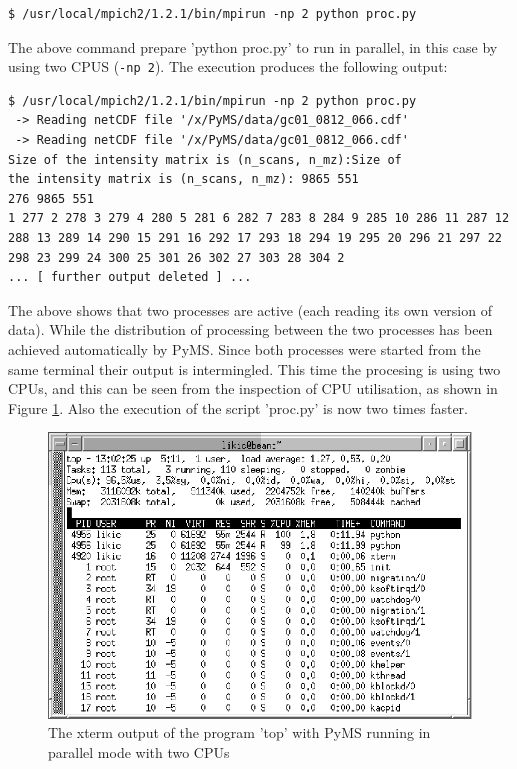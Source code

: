 \begin{verbatim}
$ /usr/local/mpich2/1.2.1/bin/mpirun -np 2 python proc.py 
\end{verbatim}

The above command prepare 'python proc.py' to run in parallel, in this
case by using two CPUS ({\tt -np 2}). The execution produces the
following output:

\begin{verbatim}
$ /usr/local/mpich2/1.2.1/bin/mpirun -np 2 python proc.py 
 -> Reading netCDF file '/x/PyMS/data/gc01_0812_066.cdf'
 -> Reading netCDF file '/x/PyMS/data/gc01_0812_066.cdf'
Size of the intensity matrix is (n_scans, n_mz):Size of
the intensity matrix is (n_scans, n_mz): 9865 551
276 9865 551
1 277 2 278 3 279 4 280 5 281 6 282 7 283 8 284 9 285 10 286 11 287 12
288 13 289 14 290 15 291 16 292 17 293 18 294 19 295 20 296 21 297 22
298 23 299 24 300 25 301 26 302 27 303 28 304 2
... [ further output deleted ] ...
\end{verbatim}

The above shows that two processes are active (each reading its own
version of data). While the distribution of processing between the
two processes has been achieved automatically by PyMS. Since both
processes were started from the same terminal their output is
intermingled. This time the procesing is using two CPUs, and this
can be seen from the inspection of CPU utilisation, as shown in
Figure \ref{fig:top-parallel}. Also the execution of the script
'proc.py' is now two times faster.

\begin{figure}
  \begin{center}
    \includegraphics[scale=1.0]{graphics/chapter09/top-parallel.eps}
  \end{center}
  \caption{The xterm output of the program 'top' with PyMS running in
  parallel mode with two CPUs}
  \label{fig:top-parallel}
\end{figure}


